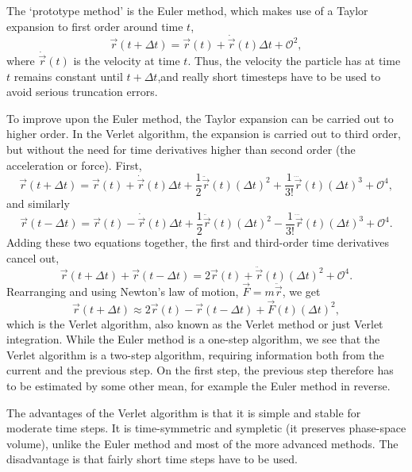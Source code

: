 \documentclass[11pt,bibliography=totoc,index=totoc]{scrbook}   %
\begin{document}
The `prototype method' is the Euler method, which makes use of a Taylor expansion to first order around time $t$,
\begin{equation}
  \vec{r}(t+\Delta t) = \vec{r}(t) + \dot{\vec{r}}(t)\Delta t + \mathcal{O}^2,
\end{equation}
where $\dot{\vec{r}}(t)$ is the velocity at time $t$. Thus, the velocity the particle has at time $t$ remains constant until $t+\Delta t$,and really short timesteps have to be used to avoid serious truncation errors.

To improve upon the Euler method, the Taylor expansion can be carried out to higher order. In the Verlet algorithm,\cite{Verlet:1968b}
the expansion is carried out to third order, but without the need for time derivatives higher than second order
(the acceleration or force). First,
\begin{equation}
  \vec{r}(t+\Delta t) = \vec{r}(t) + \dot{\vec{r}}(t)\Delta t + \frac12 \ddot{\vec{r}}(t)(\Delta t)^2
  + \frac{1}{3!} \dddot{\vec{r}}(t)(\Delta t)^3 + \mathcal{O}^4,
\end{equation}
and similarly
\begin{equation}
  \vec{r}(t-\Delta t) = \vec{r}(t) - \dot{\vec{r}}(t)\Delta t + \frac12 \ddot{\vec{r}}(t)(\Delta t)^2
   - \frac{1}{3!} \dddot{\vec{r}}(t)(\Delta t)^3 + \mathcal{O}^4.
\end{equation}
Adding these two equations together, the first and third-order time derivatives cancel out,
\begin{equation}
 \vec{r}(t+\Delta t) + \vec{r}(t-\Delta t) = 2\vec{r}(t) + \ddot{\vec{r}}(t)(\Delta t)^2 + \mathcal{O}^4.
\end{equation}
Rearranging and using Newton's law of motion, $\vec{F}=m\ddot{\vec{r}}$, we get
\begin{equation}
  \vec{r}(t+\Delta t) \approx 2\vec{r}(t) - \vec{r}(t-\Delta t) + \vec{F}(t)(\Delta t)^2,
\end{equation}
which is the Verlet algorithm, also known as the Verlet method or just Verlet integration. 
While the Euler method is a one-step algorithm, we see that the Verlet algorithm is a two-step algorithm, requiring information both from the current and the previous step.
On the first step, the previous step therefore has to be estimated by some other mean, for example the Euler method in reverse.

The advantages of the Verlet algorithm is that it is simple and stable for moderate time steps.
It is time-symmetric and sympletic (it preserves phase-space volume), unlike the Euler method and most of the more advanced methods.
The disadvantage is that fairly short time steps have to be used. 
\end{document}
